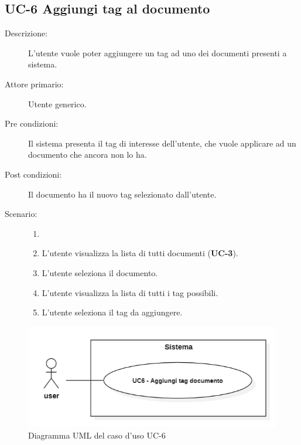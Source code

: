 \subsection{UC-6 Aggiungi tag al documento}
\begin{description}
    \item[Descrizione:] L’utente vuole poter aggiungere un tag ad uno dei documenti presenti a sistema.
    \item[Attore primario:] Utente generico.
    \item[Pre condizioni:] Il sistema presenta il tag di interesse dell'utente, che vuole applicare ad un documento che ancora non lo ha.
    \item[Post condizioni:] Il documento ha il nuovo tag selezionato dall’utente.
    \item[Scenario:]
    \begin{enumerate}
        \item[]
        \item L’utente visualizza la lista di tutti documenti (\textbf{UC-3}).
        \item L'utente seleziona il documento.
        \item L’utente visualizza la lista di tutti i tag possibili.
        \item L’utente seleziona il tag da aggiungere.
    \end{enumerate}
\end{description}

\begin{figure}[H]
    \centering
    \includegraphics[width=0.8\linewidth]{UC6.png}
    \caption{Diagramma UML del caso d'uso UC-6}
    \label{fig:UC6}
\end{figure}

